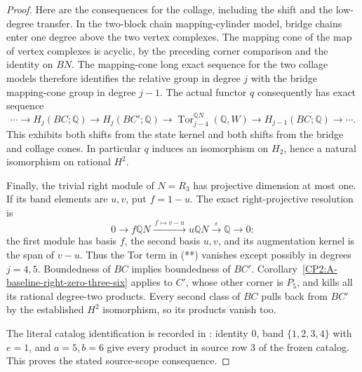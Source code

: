 \begin{proof}
Here are the consequences for the collage, including the shift
and the low-degree transfer.  In the two-block chain
mapping-cylinder model, bridge chains enter one degree above
the two vertex complexes.  The mapping cone of the map of
vertex complexes is acyclic, by the preceding corner comparison
and the identity on $BN$.  The mapping-cone long exact sequence
for the two collage models therefore identifies the relative
group in degree $j$ with the bridge mapping-cone group in
degree $j-1$.  The actual functor $q$ consequently has exact
sequence
\[
 \cdots\longrightarrow H_j(BC;\mathbb Q)
 \longrightarrow H_j(BC';\mathbb Q)
 \longrightarrow\operatorname{Tor}^{\mathbb QN}_{j-4}(\mathbb Q,W)
 \longrightarrow H_{j-1}(BC;\mathbb Q)\longrightarrow\cdots .
                                                               \tag{**}
\]
This exhibits both shifts from the state kernel and both shifts
from the bridge and collage cones.  In particular $q$ induces
an isomorphism on $H_2$, hence a natural isomorphism on rational
$H^2$.

Finally, the trivial right module of $N=R_3$ has projective
dimension at most one.  If its band elements are $u,v$, put
$f=1-u$.  The exact right-projective resolution is
\[
 0\longrightarrow f\mathbb QN
   \xrightarrow{\ f\mapsto v-u\ }u\mathbb QN
   \xrightarrow{\varepsilon}\mathbb Q\longrightarrow0:
\]
the first module has basis $f$, the second basis $u,v$,
and its augmentation kernel is the span of $v-u$.
Thus the Tor term in (**) vanishes except possibly in
degrees $j=4,5$.  Boundedness of $BC$ implies boundedness
of $BC'$.  Corollary~\ref{CP2:A-baseline-right-zero-three-six}
applies to $C'$, whose other corner is $P_5$, and kills all
its rational degree-two products.  Every second class of
$BC$ pulls back from $BC'$ by the established $H^2$
isomorphism, so its products vanish too.

The literal catalog identification is recorded in
:
identity $0$, band $\{1,2,3,4\}$ with $e=1$, and $a=5,b=6$
give every product in source row $3$ of the frozen catalog.
This proves the stated source-scope consequence.
\end{proof}
